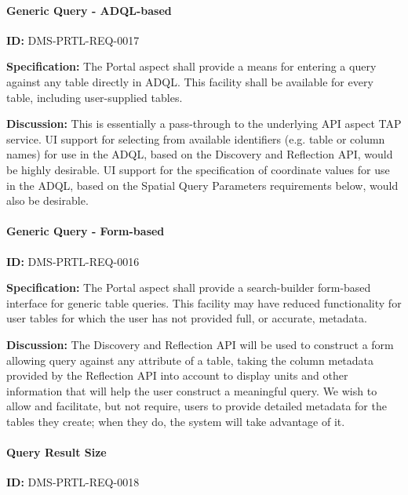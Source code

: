 \documentclass[SE,toc,lsstdraft]{lsstdoc}
\begin{document}
\paragraph{Generic Query - ADQL-based}\hfill  %

\label{DMS-PRTL-REQ-0017}
\textbf{ID:} DMS-PRTL-REQ-0017

\textbf{Specification:}
The Portal aspect shall provide a means for entering a query against any table directly in ADQL.  This facility shall be available for every table, including user-supplied tables.

\textbf{Discussion:}
This is essentially a pass-through to the underlying API aspect TAP service.
UI support for selecting from available identifiers (e.g. table or column names) for use in the ADQL, based on the Discovery and Reflection API, would be highly desirable.
UI support for the specification of coordinate values for use in the ADQL, based on the Spatial Query Parameters requirements below, would also be desirable.

\paragraph{Generic Query - Form-based}\hfill  %

\label{DMS-PRTL-REQ-0016}
\textbf{ID:} DMS-PRTL-REQ-0016

\textbf{Specification:}
The Portal aspect shall provide a search-builder form-based interface for generic table queries.  This facility may have reduced functionality for user tables for which the user has not provided full, or accurate, metadata.

\textbf{Discussion:}
The Discovery and Reflection API will be used to construct a form allowing query against any attribute of a table, taking the column metadata provided by the Reflection API into account to display units and other information that will help the user construct a meaningful query.
We wish to allow and facilitate, but not require, users to provide detailed metadata for the tables they create; when they do, the system will take advantage of it.

\paragraph{Query Result Size}\hfill  %

\label{DMS-PRTL-REQ-0018}
\textbf{ID:} DMS-PRTL-REQ-0018
\end{document}
